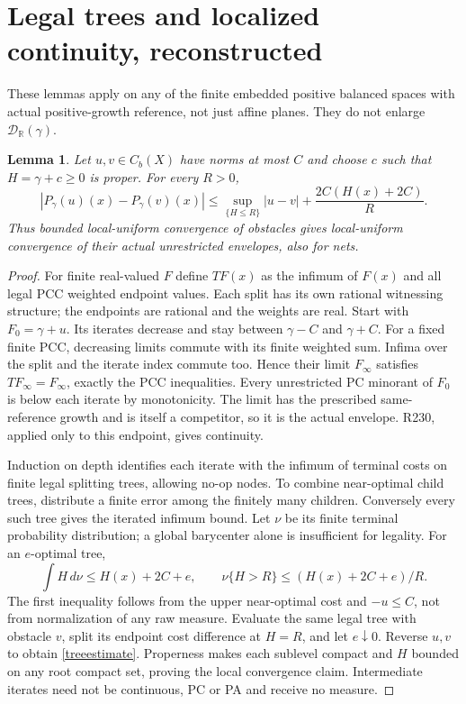 \documentclass[11pt]{article}
\newtheorem{lemma}[theorem]{Lemma}
\newcommand{\R}{\mathbb R}
\newcommand{\D}{\mathcal D_\R(\gamma)}
\begin{document}
\section{Legal trees and localized continuity, reconstructed}
These lemmas apply on any of the finite embedded positive balanced
spaces with actual positive-growth reference, not just affine planes.
They do not enlarge $\D$.

\begin{lemma}\label{tree}
Let $u,v\in C_b(X)$ have norms at most $C$ and choose $c$ such that
$H=\gamma+c\geq0$ is proper. For every $R>0$,
\begin{equation}\label{treeestimate}
 |P_\gamma(u)(x)-P_\gamma(v)(x)|
 \leq \sup_{\{H\leq R\}}|u-v|+
            \frac{2C(H(x)+2C)}{R}.
\end{equation}
Thus bounded local-uniform convergence of obstacles gives local-uniform
convergence of their actual unrestricted envelopes, also for nets.
\end{lemma}
\begin{proof}
For finite real-valued $F$ define $TF(x)$ as the infimum of $F(x)$
and all legal PCC weighted endpoint values. Each split has its own
rational witnessing structure; the endpoints are rational and the
weights are real. Start with $F_0=\gamma+u$. Its iterates decrease
and stay between $\gamma-C$ and $\gamma+C$. For a fixed finite
PCC, decreasing limits commute with its finite weighted sum. Infima
over the split and the iterate index commute too. Hence their limit
$F_\infty$ satisfies $TF_\infty=F_\infty$, exactly the PCC
inequalities. Every unrestricted PC minorant of $F_0$ is below each
iterate by monotonicity. The limit has the prescribed same-reference
growth and is itself a competitor, so it is the actual envelope.
R230, applied only to this endpoint, gives continuity.

Induction on depth identifies each iterate with the infimum of
terminal costs on finite legal splitting trees, allowing no-op nodes.
To combine near-optimal child trees, distribute a finite error among
the finitely many children. Conversely every such tree gives the
iterated infimum bound. Let $\nu$ be its finite terminal probability
distribution; a global barycenter alone is insufficient for legality.
For an $e$-optimal tree,
\[
 \int H\,d\nu\leq H(x)+2C+e,\qquad
 \nu\{H>R\}\leq (H(x)+2C+e)/R.
\]
The first inequality follows from the upper near-optimal cost and
$-u\leq C$, not from normalization of any raw measure. Evaluate the
same legal tree with obstacle $v$, split its endpoint cost difference
at $H=R$, and let $e\downarrow0$. Reverse $u,v$ to obtain
\eqref{treeestimate}. Properness makes each sublevel compact and
$H$ bounded on any root compact set, proving the local convergence
claim. Intermediate iterates need not be continuous, PC or PA and
receive no measure.
\end{proof}
\end{document}
